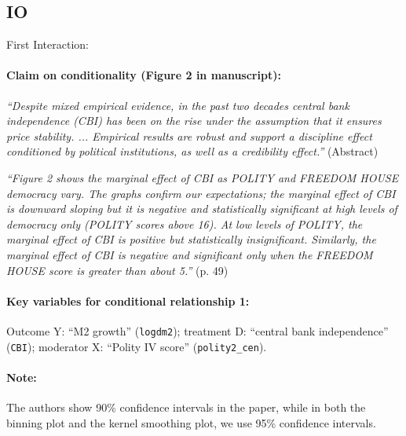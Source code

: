 \documentclass[12pt]{article}
\begin{document}

\subsection{\citet{Bodea2015_IO} IO} \label{bodea_IO}


First Interaction:


\paragraph{Claim on conditionality (Figure 2 in manuscript):} \emph{``Despite mixed empirical
  evidence, in the past two decades central bank independence (CBI) has
  been on the rise under the assumption that it ensures price
  stability. ... Empirical results are robust and support a discipline
  effect conditioned by political institutions, as well as a
  credibility effect.''} (Abstract)

\emph{``Figure 2 shows the marginal effect of CBI as POLITY and
  FREEDOM HOUSE democracy vary. The graphs confirm our expectations;
  the marginal effect of CBI is downward sloping but it is negative
  and statistically significant at high levels of democracy only
  (POLITY scores above 16). At low levels of POLITY, the marginal
  effect of CBI is positive but statistically
  insignificant. Similarly, the marginal effect of CBI is negative and
  significant only when the FREEDOM HOUSE score is greater than about  5.''} (p. 49)



\paragraph{Key variables for conditional relationship 1:} Outcome Y:
``M2 growth'' (\texttt{logdm2}); treatment D: ``central bank
independence'' (\texttt{CBI}); moderator X: ``Polity IV score'' (\texttt{polity2\_cen}).

\paragraph{Note:} The authors show 90\% confidence intervals in the paper, while in both the binning plot and the kernel smoothing plot, we use 95\% confidence intervals.


\clearpage
\end{document}
